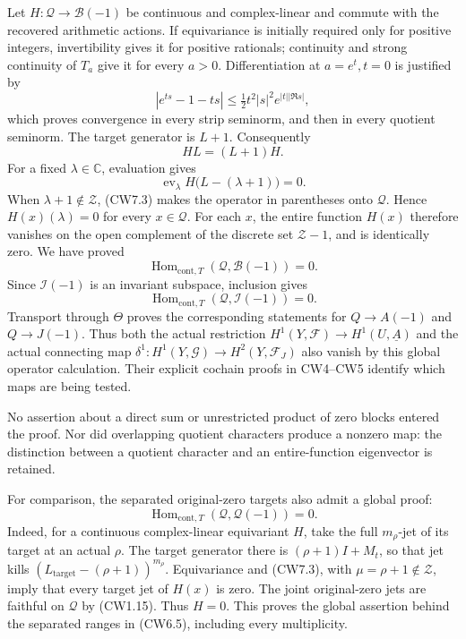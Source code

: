 Let \(H:\mathcal Q\to\mathcal B(-1)\) be continuous and complex-linear
and commute with the recovered arithmetic actions. If equivariance is
initially required only for positive integers, invertibility gives it
for positive rationals; continuity and strong continuity of \(T_a\) give
it for every \(a>0\). Differentiation at \(a=e^t,t=0\) is justified by
\[
|e^{ts}-1-ts|\le\tfrac12t^2|s|^2e^{|t||\Re s|},
\] which proves convergence in every strip seminorm, and then in every
quotient seminorm. The target generator is \(L+1\). Consequently \[
H L=(L+1)H.
\tag{CW7.4}
\] For a fixed \(\lambda\in\mathbb C\), evaluation gives \[
\operatorname{ev}_\lambda H\bigl(L-(\lambda+1)\bigr)=0.
\tag{CW7.5}
\] When \(\lambda+1\notin\mathscr Z\), (CW7.3) makes the operator in
parentheses onto \(\mathcal Q\). Hence \(H(x)(\lambda)=0\) for every
\(x\in\mathcal Q\). For each \(x\), the entire function \(H(x)\)
therefore vanishes on the open complement of the discrete set
\(\mathscr Z-1\), and is identically zero. We have proved \[
\boxed{\operatorname{Hom}_{\mathrm{cont},T}
(\mathcal Q,\mathcal B(-1))=0.}
\tag{CW7.6}
\] Since \(\mathcal I(-1)\) is an invariant subspace, inclusion gives \[
\boxed{\operatorname{Hom}_{\mathrm{cont},T}
(\mathcal Q,\mathcal I(-1))=0.}
\tag{CW7.7}
\] Transport through \(\Theta\) proves the corresponding statements for
\(Q\to A(-1)\) and \(Q\to J(-1)\). Thus both the actual restriction
\(H^1(Y,\mathscr F)\to H^1(U,\underline A)\) and the actual connecting
map \(\delta^1:H^1(Y,\mathscr G)\to H^2(Y,\mathscr F_J)\) also vanish by
this global operator calculation. Their explicit cochain proofs in
CW4--CW5 identify which maps are being tested.

No assertion about a direct sum or unrestricted product of zero blocks
entered the proof. Nor did overlapping quotient characters produce a
nonzero map: the distinction between a quotient character and an
entire-function eigenvector is retained.

For comparison, the separated original-zero targets also admit a global
proof: \[
\operatorname{Hom}_{\mathrm{cont},T}(\mathcal Q,\mathcal Q(-1))=0.
\tag{CW7.8}
\] Indeed, for a continuous complex-linear equivariant \(H\), take the
full \(m_\rho\)-jet of its target at an actual \(\rho\). The target
generator there is \((\rho+1)I+M_t\), so that jet kills
\((L_{\mathrm{target}}-(\rho+1))^{m_\rho}\). Equivariance and (CW7.3),
with \(\mu=\rho+1\notin\mathscr Z\), imply that every target jet of
\(H(x)\) is zero. The joint original-zero jets are faithful on
\(\mathcal Q\) by (CW1.15). Thus \(H=0\). This proves the global
assertion behind the separated ranges in (CW6.5), including every
multiplicity.

